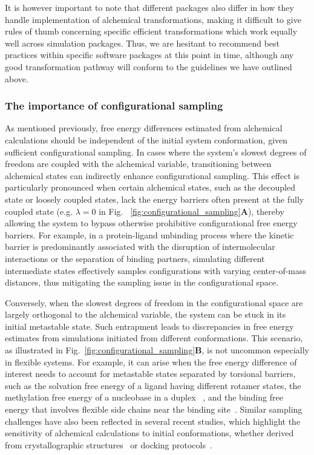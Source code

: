 \documentclass[9pt,bestpractices]{livecoms}
\begin{document}
It is however important to note that different packages also differ in how they handle implementation of alchemical transformations, making it difficult to give rules of thumb concerning specific efficient transformations which work equally well across simulation packages. Thus, we are hesitant to recommend best practices within specific software packages at this point in time, although any good transformation pathway will conform to the guidelines we have outlined above.

\subsubsection{The importance of configurational sampling}
\label{sec:configurational_sampling}
As mentioned previously, free energy differences estimated from alchemical calculations should be independent of the initial system conformation, given sufficient configurational sampling. In cases where the system's slowest degrees of freedom are coupled with the alchemical variable, transitioning between alchemical states can indirectly enhance configurational sampling. This effect is particularly pronounced when certain alchemical states, such as the decoupled state or loosely coupled states, lack the energy barriers often present at the fully coupled state (e.g. $\lambda=0$ in Fig. ~\ref{fig:configurational_sampling}\textbf{A}), thereby allowing the system to bypass otherwise prohibitive configurational free energy barriers. For example, in a protein-ligand unbinding process where the kinetic barrier is predominantly associated with the disruption of intermolecular interactions or the separation of binding partners, simulating different intermediate states effectively samples configurations with varying center-of-mass distances, thus mitigating the sampling issue in the configurational space. 

Conversely, when the slowest degrees of freedom in the configurational space are largely orthogonal to the alchemical variable, the system can be stuck in its initial metastable state. Such entrapment leads to discrepancies in free energy estimates from simulations initiated from different conformations. This scenario, as illustrated in Fig.~\ref{fig:configurational_sampling}\textbf{B}, is not uncommon especially in flexible systems. For example, it can arise when the free energy difference of interest needs to account for metastable states separated by torsional barriers, such as the solvation free energy of a ligand having different rotamer states, the methylation free energy of a nucleobase in a duplex ~\cite{hsu2023alchemical}, and the binding free energy that involves flexible side chains near the binding site~\cite{la2022alchemical}. Similar sampling challenges have also been reflected in several recent studies, which highlight the sensitivity of alchemical calculations to initial conformations, whether derived from crystallographic structures~\cite{suruzhon2021sensitivity, baumann2024impact} or docking protocols~\cite{cappel2020impact}. 
\end{document}
